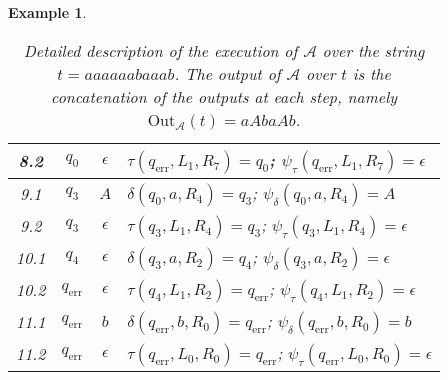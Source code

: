 \documentclass{article}
\newtheorem{example}[definition]{Example}
\begin{document}
\begin{example}
\begin{table}[h!]
\begin{adjustbox}{width=1.2\textwidth,center=\textwidth}
\begin{tabular}{c|c|c|p{130mm}}
				8.2 & $q_0$ & $\epsilon$ & 
					$\tau(q_\mathrm{err}, L_1, R_7)=q_0$; $\psi_\tau(q_\mathrm{err}, L_1, R_7)=\epsilon$ \\ \hline
				9.1 & $q_3$ & $A$ & 
					$\delta(q_0, a, R_4) = q_3$; $\psi_\delta(q_0, a, R_4) = A$ \\ \hline
				9.2 & $q_3$ & $\epsilon$ & 
					$\tau(q_3, L_1, R_4)=q_3$; $\psi_\tau(q_3, L_1, R_4)=\epsilon$ \\ \hline
				10.1 & $q_4$ & $\epsilon$ & 
					$\delta(q_3, a, R_2) = q_4$; $\psi_\delta(q_3, a, R_2) = \epsilon$ \\ \hline
				10.2 & $q_\mathrm{err}$ & $\epsilon$ & 
					$\tau(q_4, L_1, R_2)=q_\mathrm{err}$; $\psi_\tau(q_4, L_1, R_2)=\epsilon$ \\ \hline
				11.1 & $q_\mathrm{err}$ & $b$ & 
					$\delta(q_\mathrm{err}, b, R_0) = q_\mathrm{err}$; $\psi_\delta(q_\mathrm{err}, b, R_0) = b$ \\ \hline
				11.2 & $q_\mathrm{err}$ & $\epsilon$ & 
					$\tau(q_\mathrm{err}, L_0, R_0)=q_\mathrm{err}$; $\psi_\tau(q_\mathrm{err}, L_0, R_0)=\epsilon$ \\
			\end{tabular}
		\end{adjustbox}
		\caption{Detailed description of the execution of $\mathcal{A}$ over the string $t=aaaaaabaaab$. The output of $\mathcal{A}$ over $t$ is the concatenation of the outputs at each step, namely $\mathrm{Out}_\mathcal{A}(t)=aAbaAb$.}
		\label{table:ex:tsbm:execution}
		\end{table}
\fi
	\end{example}
\end{document}
